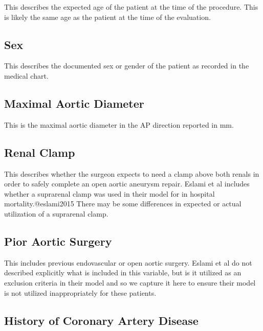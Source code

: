 \documentclass[
]{book}
\begin{document}
This describes the expected age of the patient at the time of the procedure. This is likely the same age as the patient at the time of the evaluation.

\hypertarget{sex}{%
\subsection{Sex}\label{sex}}

This describes the documented sex or gender of the patient as recorded in the medical chart.

\hypertarget{maximal-aortic-diameter}{%
\subsection{Maximal Aortic Diameter}\label{maximal-aortic-diameter}}

This is the maximal aortic diameter in the AP direction reported in mm.

\hypertarget{renal-clamp}{%
\subsection{Renal Clamp}\label{renal-clamp}}

This describes whether the surgeon expects to need a clamp above both renals in order to safely complete an open aortic aneurysm repair. Eslami et al includes whether a suprarenal clamp was used in their model for in hospital mortality.@eslami2015 There may be some differences in expected or actual utilization of a suprarenal clamp.

\hypertarget{pior-aortic-surgery}{%
\subsection{Pior Aortic Surgery}\label{pior-aortic-surgery}}

This includes previous endovascular or open aortic surgery. Eslami et al do not described explicitly what is included in this variable, but is it utilized as an exclusion criteria in their model and so we capture it here to ensure their model is not utilized inappropriately for these patients. \citet{eslami2015}

\hypertarget{history-of-coronary-artery-disease}{%
\subsection{History of Coronary Artery Disease}\label{history-of-coronary-artery-disease}}
\end{document}
